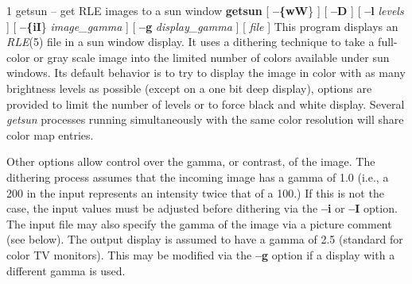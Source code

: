 %
%
%
 1
getsun -- get RLE images to a sun window 
{\bf getsun}
[
{\bf --\{wW}\}
] [
{\bf --D}
] [
{\bf --l} 
{\it levels}
] [
{\bf --\{iI}\}
{\it image\_gamma}
] [
{\bf --g}
{\it display\_gamma}
] [ 
{\it file}
]
This program displays an
{\it RLE}{\rm (5)}
file in a sun window
display.  It uses a dithering technique to take a
full-color or gray scale image into the limited number of colors
available under sun windows.
Its default behavior is to try to
display the image in color with as many brightness levels as possible
(except on a one bit deep display), options are provided to limit the
number of levels or to force black and white display.  Several
{\it getsun}
processes running simultaneously with the same color resolution will
share color map entries.

Other options allow control over the gamma, or contrast, of the image.
The dithering process assumes that the incoming image has a gamma of
1.0 (i.e., a 200 in the input represents an intensity twice that of
a 100.)  If this is not the case, the input values must be adjusted
before dithering via the
{\bf --i}
or 
{\bf --I}
option.  The input file may also specify the gamma of the image via a
picture comment (see below).  The output display is assumed to have a gamma of
2.5 (standard for color TV monitors).  This may be modified via the
{\bf --g}
option if a display with a different gamma is used.

